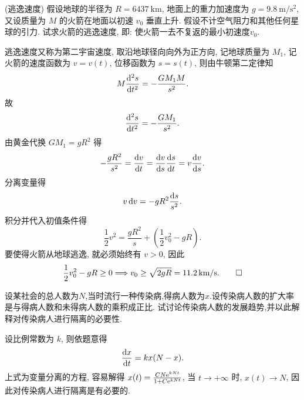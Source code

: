 \begin{exercise}(逃逸速度)
  假设地球的半径为 $R=\qty{6437}{\kilo\metre}$,
  地面上的重力加速度为 $g=\qty[per-mode=symbol]{9.8}{\meter\per\square\second}$,
  又设质量为 $M$ 的火箭在地面以初速 $v_0$ 垂直上升.
  假设不计空气阻力和其他任何星球的引力. 试求火箭的逃逸速度, 即: 使火箭一去不复返的最小初速度$v_0$.
\end{exercise}

\begin{solve}
逃逸速度又称为第二宇宙速度, 取沿地球径向向外为正方向, 记地球质量为 $M_1$,
记火箭的速度函数为 $v=v(t)$, 位移函数为 $s=s(t)$, 则由牛顿第二定律知
\[M\frac{\mathop{}\!\mathrm{d}^2s}{\mathop{}\!\mathrm{d} t^2}=-\frac{GM_1M}{s^2}.\]
故
\[\frac{\mathop{}\!\mathrm{d}^2s}{\mathop{}\!\mathrm{d} t^2}=-\frac{GM_1}{s^2}.\]
由黄金代换 $GM_1=gR^2$ 得
\[-\frac{gR^2}{s^2}=\frac{\diff v}{\diff t}=\frac{\diff v}{\diff s}\frac{\diff s}{\diff t}
  =v\frac{\diff v}{\diff s}.\]
分离变量得
\[v\mathop{}\!\mathrm{d} v=-gR^2\frac{\mathop{}\!\mathrm{d} s}{s^2}.\]
积分并代入初值条件得
\[\frac{1}{2}v^2=\frac{gR^2}{s}+\left(\frac{1}{2}v_0^2-gR\right).\]
要使得火箭从地球逃逸, 就必须始终有 $v>0$, 因此
\[\frac{1}{2}v_0^2-gR\geq 0
\Longrightarrow v_0\geq\sqrt{2gR}=\qty[per-mode=symbol]{11.2}{\kilo\meter\per\second}.\qedhere\]
\end{solve}



\begin{exercise}
  设某社会的总人数为$N$,当时流行一种传染病,得病人数为$x$.设传染病人数的扩大率是与得病人数和未得病人数的乘积成正比.
  试讨论传染病人数的发展趋势,并以此解释对传染病人进行隔离的必要性.
\end{exercise}

\begin{solve}
  设比例常数为 $k$, 则依题意得
  \[\frac{\mathop{}\!\mathrm{d} x}{\mathop{}\!\mathrm{d} t}=kx(N-x).\]
  上式为变量分离的方程, 容易解得 $x(t)=\frac{CN\mathrm{e}^{kNt}}{1+C\mathrm{e}^{kNt}}$,
  当 $t\to+\infty$ 时, $x(t)\to N$, 因此对传染病人进行隔离是有必要的.
\end{solve}